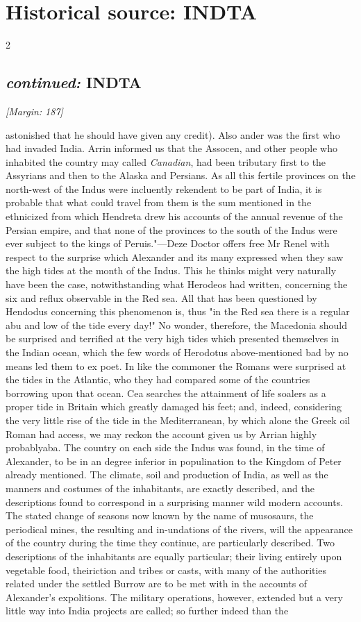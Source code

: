 \documentclass[10pt]{article}
\begin{document}
\section*{Historical source: INDTA}
\begin{multicols}{2}
\subsection*{\textit{continued:} INDTA}
{\small\itshape [Margin: 187]}\par
astonished that he should have given any credit). Also ander was the first who had invaded India. Arrin informed us that the Assocen, and other people who inhabited the country may called \emph{Canadian}, had been tributary first to the Assyrians and then to the Alaska and Persians. As all this fertile provinces on the north-west of the Indus were incluently rekendent to be part of India, it is probable that what could travel from them is the sum mentioned in the ethnicized from which Hendreta drew his accounts of the annual revenue of the Persian empire, and that none of the provinces to the south of the Indus were ever subject to the kings of Peruis."—Deze Doctor offers free Mr Renel with respect to the surprise which Alexander and its many expressed when they saw the high tides at the month of the Indus. This he thinks might very naturally have been the case, notwithstanding what Herodeos had written, concerning the six and reflux observable in the Red sea. All that has been questioned by Hendodus concerning this phenomenon is, thus "in the Red sea there is a regular abu and low of the tide every day!" No wonder, therefore, the Macedonia should be surprised and terrified at the very high tides which presented themselves in the Indian ocean, which the few words of Herodotus above-mentioned bad by no means led them to ex poet. In like the commoner the Romans were surprised at the tides in the Atlantic, who they had compared some of the countries borrowing upon that ocean. Cea searches the attainment of life soalers as a proper tide in Britain which greatly damaged his feet; and, indeed, considering the very little rise of the tide in the Mediterranean, by which alone the Greek oil Roman had access, we may reckon the account given us by Arrian highly probablyaba. The country on each side the Indus was found, in the time of Alexander, to be in an degree inferior in populination to the Kingdom of Peter already mentioned. The climate, soil and production of India, as well as the manners and costumes of the inhabitants, are exactly described, and the descriptions found to correspond in a surprising manner wild modern accounts. The stated change of seasons now known by the name of musosaurs, the periodical mines, the resulting and in-undations of the rivers, will the appearance of the country during the time they continue, are particularly described. Two descriptions of the inhabitants are equally particular; their living entirely upon vegetable food, theiriction and tribes or casts, with many of the authorities related under the settled Burrow are to be met with in the accounts of Alexander’s expolitions. The military operations, however, extended but a very little way into India projects are called; so further indeed than the 
\end{multicols}
\end{document}
